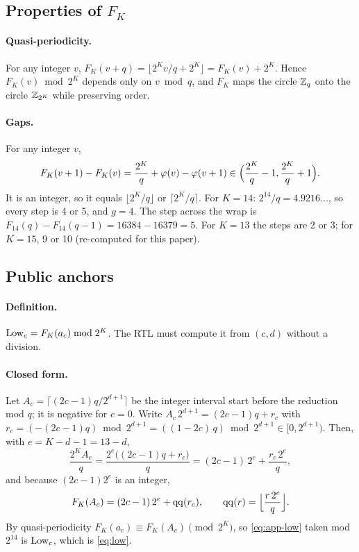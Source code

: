 \subsection{Properties of \texorpdfstring{$F_K$}{F\_K}}\label{app:math-gap}
\paragraph{Quasi-periodicity.} For any integer $v$, $F_K(v + q) = \lfloor 2^K v/q + 2^K \rfloor = F_K(v) + 2^K$. Hence $F_K(v) \bmod 2^K$ depends only on $v \bmod q$, and $F_K$ maps the circle $\mathbb{Z}_q$ onto the circle $\mathbb{Z}_{2^K}$ while preserving order.

\paragraph{Gaps.} For any integer $v$,
\[ F_K(v+1) - F_K(v) = \frac{2^K}{q} + \varphi(v) - \varphi(v+1) \in \Bigl(\frac{2^K}{q} - 1, \frac{2^K}{q} + 1\Bigr). \]
It is an integer, so it equals $\lfloor 2^K/q \rfloor$ or $\lceil 2^K/q \rceil$. For $K = 14$: $2^{14}/q = 4.9216\ldots$, so every step is 4 or 5, and $g = 4$. The step across the wrap is $F_{14}(q) - F_{14}(q-1) = 16384 - 16379 = 5$. For $K = 13$ the steps are 2 or 3; for $K = 15$, 9 or 10 (re-computed for this paper).

\subsection{Public anchors}\label{app:math-anchors}
\paragraph{Definition.} $\mathrm{Low}_c = F_K(a_c) \bmod 2^K$. The RTL must compute it from $(c, d)$ without a division.

\paragraph{Closed form.} Let $A_c = \lceil (2c-1)q/2^{d+1} \rceil$ be the integer interval start before the reduction mod $q$; it is negative for $c = 0$. Write $A_c\,2^{d+1} = (2c-1)q + r_c$ with $r_c = (-(2c-1)q) \bmod 2^{d+1} = ((1 - 2c)\,q) \bmod 2^{d+1} \in [0, 2^{d+1})$. Then, with $e = K - d - 1 = 13 - d$,
\begin{equation}
  \frac{2^K A_c}{q} = \frac{2^{e}\bigl((2c-1)q + r_c\bigr)}{q} = (2c-1)\,2^{e} + \frac{r_c\,2^{e}}{q},
\end{equation}
and because $(2c-1)2^e$ is an integer,
\begin{equation}\label{eq:app-low}
  F_K(A_c) = (2c-1)\,2^{e} + \mathrm{qq}(r_c), \qquad \mathrm{qq}(r) = \Bigl\lfloor \frac{r\,2^{e}}{q} \Bigr\rfloor .
\end{equation}
By quasi-periodicity $F_K(a_c) \equiv F_K(A_c) \pmod{2^K}$, so \cref{eq:app-low} taken mod $2^{14}$ is $\mathrm{Low}_c$, which is \cref{eq:low}.

